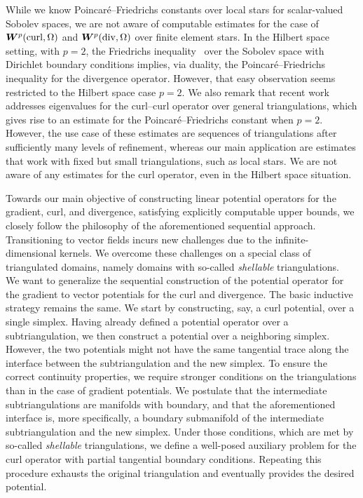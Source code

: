 \documentclass[10pt,letterpaper]{article}
\begin{document}
While we know Poincar\'e--Friedrichs constants over local stars for scalar-valued Sobolev spaces, 
we are not aware of computable estimates for the case of $\bm{W}^{p}(\operatorname{curl},\Omega)$ and $\bm{W}^{p}(\operatorname{div},\Omega)$ over finite element stars. 
In the Hilbert space setting, with $p=2$, the Friedrichs inequality~\cite{burenkov1998sobolev} over the Sobolev space with Dirichlet boundary conditions implies, 
via duality, the Poincar\'e--Friedrichs inequality for the divergence operator. However, that easy observation seems restricted to the Hilbert space case $p=2$. 
We also remark that recent work~\cite{gallistl2023computational} addresses eigenvalues for the curl--curl operator over general triangulations,
which gives rise to an estimate for the Poincar\'e--Friedrichs constant when $p=2$. However, the use case of these estimates are sequences of triangulations after sufficiently many levels of refinement, whereas our main application are estimates that work with fixed but small triangulations, such as local stars. 
We are not aware of any estimates for the curl operator, even in the Hilbert space situation. 

Towards our main objective of constructing linear potential operators for the gradient, curl, and divergence, satisfying explicitly computable upper bounds, we closely follow the philosophy of the aforementioned sequential approach. Transitioning to vector fields incurs new challenges due to the infinite-dimensional kernels. We overcome these challenges on a special class of triangulated domains, namely domains with so-called \emph{shellable} triangulations. 
\\




We want to generalize the sequential construction of the potential operator for the gradient to vector potentials for the curl and divergence. The basic inductive strategy remains the same. We start by constructing, say, a curl potential, over a single simplex. Having already defined a potential operator over a subtriangulation, we then construct a potential over a neighboring simplex. However, the two potentials might not have the same tangential trace along the interface between the subtriangulation and the new simplex. 
% 
To ensure the correct continuity properties, we require stronger conditions on the triangulations than in the case of gradient potentials. We postulate that the intermediate subtriangulations are manifolds with boundary, and that the aforementioned interface is, more specifically, a boundary submanifold of the intermediate subtriangulation and the new simplex. Under those conditions, which are met by so-called \textit{shellable} triangulations, we define a well-posed auxiliary problem for the curl operator with partial tangential boundary conditions. Repeating this procedure exhausts the original triangulation and eventually provides the desired potential.
\\
\end{document}
